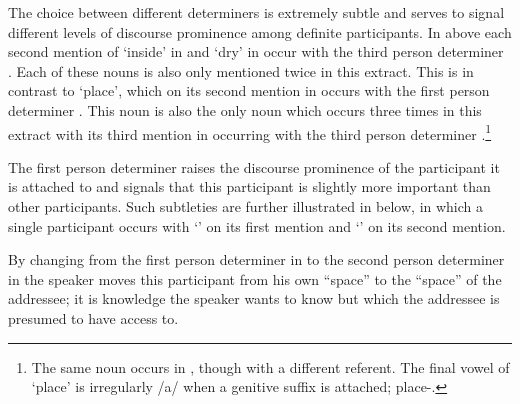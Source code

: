 The choice between different determiners is extremely subtle
and serves to signal different levels of discourse prominence among definite participants.
In  above
each second mention of  `inside'
in  and  `dry'
in  occur with
the third person determiner .
Each of these nouns is also only mentioned twice in this extract.
This is in contrast to  `place', which on its second mention
in  occurs with the first person determiner .
This noun is also the only noun which occurs three times in this extract
with its third mention in 
occurring with the third person determiner .\footnote{
		The same noun occurs in ,
		though with a different referent.
		The final vowel of  `place' is irregularly /a/
		when a genitive suffix is attached;  place-{\N}.}

The first person determiner raises the discourse prominence
of the participant it is attached to and signals that this
participant is slightly more important than other participants.
Such subtleties are further illustrated in  below,
in which a single participant occurs with  `{\ii}' on its
first mention and  `{\aan}' on its second mention.

\begin{exe}
	\label{ex:130825-6}
	\begin{xlist}
		\label{ex2:130825-6, 2.06}
		\label{ex:130825-6, 2.09}
	\end{xlist}
\end{exe}

By changing from the first person determiner in 
to the second person determiner  in 
the speaker moves this participant from his own ``space'' to the ``space''
of the addressee; it is knowledge the speaker wants to know
but which the addressee is presumed to have access to.

